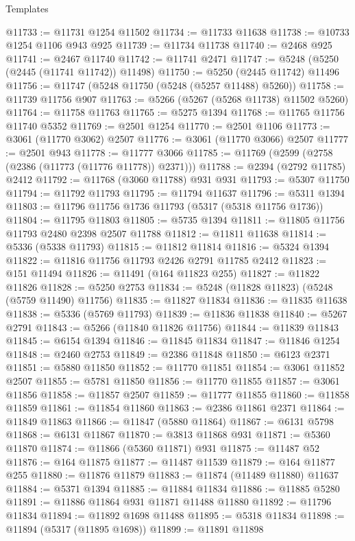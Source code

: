 \begin{lexlean}{Templates}
\begin{coremodule}
@11733 := @11731 @1254 @11502
@11734 := @11733 @11638
@11738 := @10733 @1254 @1106 @943 @925
@11739 := @11734 @11738
@11740 := @2468 @925
@11741 := @2467 @11740
@11742 := @11741 @2471
@11747 := @5248 (@5250 (@2445 (@11741 @11742)) @11498)
@11750 := @5250 (@2445 @11742) @11496
@11756 := @11747 (@5248 @11750 (@5248 (@5257 @11488) @5260))
@11758 := @11739 @11756 @907
@11763 := @5266 (@5267 (@5268 @11738) @11502 @5260)
@11764 := @11758 @11763
@11765 := @5275 @1394
@11768 := @11765 @11756 @11740 @5352
@11769 := @2501 @1254
@11770 := @2501 @1106
@11773 := @3061 (@11770 @3062) @2507
@11776 := @3061 (@11770 @3066) @2507
@11777 := @2501 @943
@11778 := @11777 @3066
@11785 := @11769 (@2599 (@2758 (@2386 (@11773 (@11776 @11778)) @2371)))
@11788 := @2394 (@2792 @11785) @2412
@11792 := @11768 (@3060 @11788) @931 @931
@11793 := @5307 @11750
@11794 := @11792 @11793
@11795 := @11794 @11637
@11796 := @5311 @1394
@11803 := @11796 @11756 @1736 @11793 (@5317 (@5318 @11756 @1736))
@11804 := @11795 @11803
@11805 := @5735 @1394
@11811 := @11805 @11756 @11793 @2480 @2398 @2507 @11788
@11812 := @11811 @11638
@11814 := @5336 (@5338 @11793)
@11815 := @11812 @11814
@11816 := @5324 @1394
@11822 := @11816 @11756 @11793 @2426 @2791 @11785 @2412
@11823 := @151 @11494
@11826 := @11491 (@164 @11823 @255)
@11827 := @11822 @11826
@11828 := @5250 @2753
@11834 := @5248 (@11828 @11823) (@5248 (@5759 @11490) @11756)
@11835 := @11827 @11834
@11836 := @11835 @11638
@11838 := @5336 (@5769 @11793)
@11839 := @11836 @11838
@11840 := @5267 @2791
@11843 := @5266 (@11840 @11826 @11756)
@11844 := @11839 @11843
@11845 := @6154 @1394
@11846 := @11845 @11834
@11847 := @11846 @1254
@11848 := @2460 @2753
@11849 := @2386 @11848
@11850 := @6123 @2371
@11851 := @5880 @11850
@11852 := @11770 @11851
@11854 := @3061 @11852 @2507
@11855 := @5781 @11850
@11856 := @11770 @11855
@11857 := @3061 @11856
@11858 := @11857 @2507
@11859 := @11777 @11855
@11860 := @11858 @11859
@11861 := @11854 @11860
@11863 := @2386 @11861 @2371
@11864 := @11849 @11863
@11866 := @11847 (@5880 @11864)
@11867 := @6131 @5798
@11868 := @6131 @11867
@11870 := @3813 @11868 @931
@11871 := @5360 @11870
@11874 := @11866 (@5360 @11871) @931
@11875 := @11487 @52
@11876 := @164 @11875
@11877 := @11487 @11539
@11879 := @164 @11877 @255
@11880 := @11876 @11879
@11883 := @11874 (@11489 @11880) @11637
@11884 := @5371 @1394
@11885 := @11884 @11834
@11886 := @11885 @5280
@11891 := @11886 @11864 @931 @11871 @11488 @11880
@11892 := @11796 @11834
@11894 := @11892 @1698 @11488
@11895 := @5318 @11834
@11898 := @11894 (@5317 (@11895 @1698))
@11899 := @11891 @11898

\end{coremodule}
\end{lexlean}
